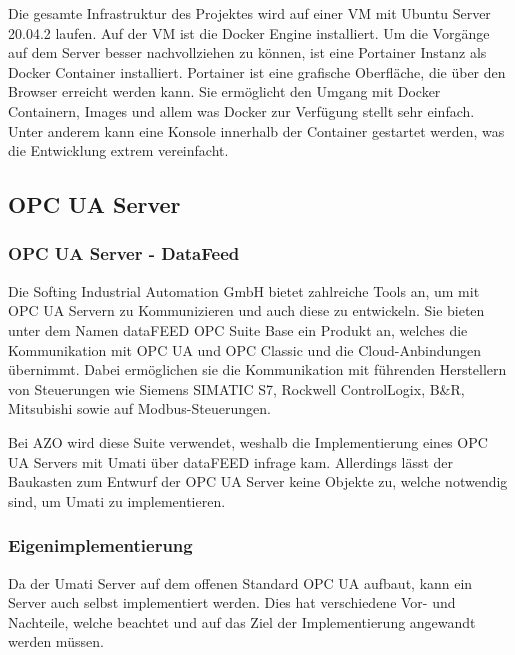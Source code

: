 \documentclass[a4paper, 12pt, oneside, toc=listofnumbered, bibliography=totoc]{scrbook}
\begin{document}
		Die gesamte Infrastruktur des Projektes wird auf einer VM mit Ubuntu Server 20.04.2 laufen. Auf der VM ist die Docker Engine installiert. Um die Vorgänge auf dem Server besser nachvollziehen zu können, ist eine Portainer Instanz als Docker Container installiert. Portainer ist eine grafische Oberfläche, die über den Browser erreicht werden kann. Sie ermöglicht den Umgang mit Docker Containern, Images und allem was Docker zur Verfügung stellt sehr einfach. Unter anderem kann eine Konsole innerhalb der Container gestartet werden, was die Entwicklung extrem vereinfacht. 
		
		\subsection{OPC UA Server}
		
			\subsubsection{OPC UA Server - DataFeed}
				
			Die Softing Industrial Automation GmbH bietet zahlreiche Tools an, um mit OPC UA Servern zu Kommunizieren und auch diese zu entwickeln. Sie bieten unter dem Namen dataFEED OPC Suite Base ein Produkt an, welches die Kommunikation mit OPC UA und OPC Classic und die Cloud-Anbindungen übernimmt. Dabei ermöglichen sie die Kommunikation mit führenden Herstellern von Steuerungen wie  Siemens SIMATIC S7, Rockwell ControlLogix, B\&R, Mitsubishi sowie auf Modbus-Steuerungen. \cite{noauthor_datafeed_nodate}
		
			Bei AZO wird diese Suite verwendet, weshalb die Implementierung eines OPC UA Servers mit Umati über dataFEED infrage kam. Allerdings lässt der Baukasten zum Entwurf der OPC UA Server keine Objekte zu, welche notwendig sind, um Umati zu implementieren.
					
			\subsubsection{Eigenimplementierung}
		
					
			Da der Umati Server auf dem offenen Standard OPC UA aufbaut, kann ein Server auch selbst implementiert werden. Dies hat verschiedene Vor- und Nachteile, welche beachtet und auf das Ziel der Implementierung angewandt werden müssen. 
			
\end{document}
